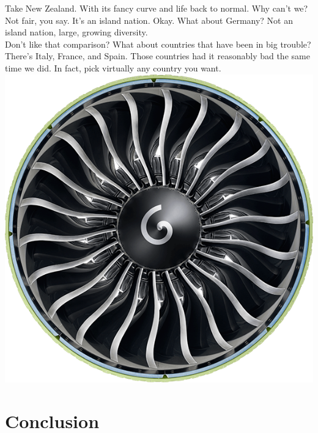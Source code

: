 \documentclass{article}
\begin{document}
Take New Zealand. With its fancy curve and life back to normal. Why can’t we? Not fair, you say. It’s an island nation. Okay. What about Germany? Not an island nation, large, growing diversity. \\Don’t like that comparison? What about countries that have been in big trouble? There’s Italy, France, and Spain. Those countries had it reasonably bad the same time we did. In fact, pick virtually any country you want.
\includegraphics[scale=0.25]{ge90-front_0}
\section{Conclusion}
\end{document}

